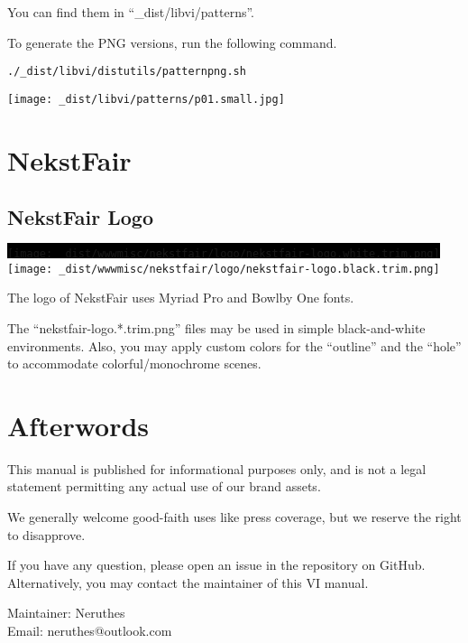 \documentclass[a4paper,11pt]{report}
\begin{document}
You can find them in ``\_dist/libvi/patterns''.

To generate the PNG versions, run the following command.

\begin{verbatim}
./_dist/libvi/distutils/patternpng.sh
\end{verbatim}

{\texttt{[image: \_dist/libvi/patterns/p01.small.jpg]}}











\chapter{NekstFair}
\section{NekstFair Logo}
\colorbox{black}{\texttt{[image: \_dist/wwwmisc/nekstfair/logo/nekstfair-logo.white.trim.png]}}\hfill%
\colorbox{white}{\texttt{[image: \_dist/wwwmisc/nekstfair/logo/nekstfair-logo.black.trim.png]}}

The logo of NekstFair uses Myriad Pro and Bowlby One fonts.

The ``nekstfair-logo.*.trim.png'' files may be used in simple black-and-white environments.
Also, you may apply custom colors for the ``outline'' and the ``hole'' to accommodate colorful/monochrome scenes.






\chapter{Afterwords}
This manual is published for informational purposes only,
and is not a legal statement permitting any actual use of our brand assets.

We generally welcome good-faith uses like press coverage,
but we reserve the right to disapprove.

If you have any question, please open an issue in the repository on GitHub.
Alternatively, you may contact the maintainer of this VI manual.

Maintainer: Neruthes\\
Email: neruthes@outlook.com
\end{document}
